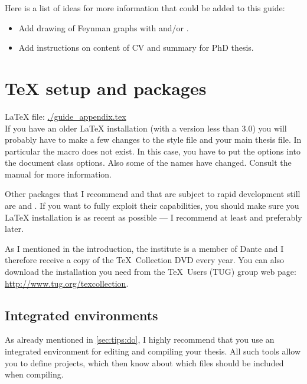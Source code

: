 Here is a list of ideas for more information that could be added to
this guide:
\begin{itemize}
\item Add drawing of Feynman graphs with  and/or
  .
\item Add instructions on content of CV and summary for PhD thesis.
\end{itemize}


\chapter{\TeX{} setup and packages}%
\label{sec:app:tex}

\LaTeX{} file: \url{./guide_appendix.tex}\\[1ex]
\noindent
If you have an older \LaTeX{} installation (with a \KOMAScript{}
version less than 3.0) you will probably have to make a few changes to
the style file and your main thesis file.
In particular the  macro does not exist. In this case, you
have to put the options into the document class options. Also some of
the names have changed. Consult the \KOMAScript{} manual for more
information.

Other packages that I recommend and that are subject to rapid
development still are  and
. If you want to fully exploit their capabilities,
you should make sure you \LaTeX{} installation is as recent as
possible --- I recommend at least  and preferably later.

As I mentioned in the introduction, the institute is a member of Dante
and I therefore receive a copy of the \TeX\ Collection DVD every
year. You can also download the installation you need from the \TeX\
Users (TUG) group web page: \url{http://www.tug.org/texcollection}.


\section{Integrated environments}%
\label{sec:app:compile}

As already mentioned in \cref{sec:tips:do}, I highly recommend
that you use an integrated environment for editing and compiling your
thesis. All such tools allow you to define projects, which then know
about which files should be included when compiling.

